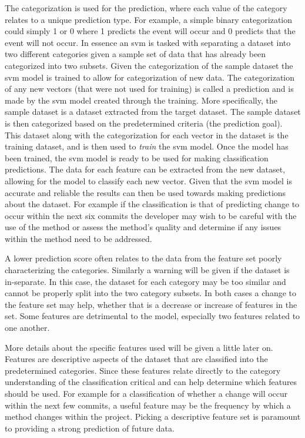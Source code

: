 
The categorization is used for the prediction, where each value of the category relates to a unique prediction type. For example, a simple binary categorization could simply 1 or 0 where 1 predicts the event will occur and 0 predicts that the event will not occur. In essence an \gls{svm} is tasked with separating a dataset into two different categories given a sample set of data that has already been categorized into two subsets. Given the categorization of the sample dataset the \gls{svm} model is trained to allow for categorization of new data. The categorization of any new vectors (that were not used for training) is called a prediction and is made by the \gls{svm} model created through the training. More specifically, the sample dataset is a dataset extracted from the target dataset. The sample dataset is then categorized based on the predetermined criteria (the prediction goal). This dataset along with the categorization for each vector in the dataset is the training dataset, and is then used to \textit{train} the \gls{svm} model. Once the model has been trained, the \gls{svm} model is ready to be used for making classification predictions. The data for each feature can be extracted from the new dataset, allowing for the model to classify each new vector. Given that the \gls{svm} model is accurate and reliable the results can then be used towards making predictions about the dataset. For example if the classification is that of predicting change to occur within the next six commits the developer may wish to be careful with the use of the method or assess the method's quality and determine if any issues within the method need to be addressed.

A lower prediction score often relates to the data from the feature set poorly characterizing the categories. Similarly a warning will be given if the dataset is in-separate. In this case, the dataset for each category may be too similar and cannot be properly split into the two category subsets. In both cases a change to the feature set may help, whether that is a decrease or increase of features in the set. Some features are detrimental to the model, especially two features related to one another. %

More details about the specific features used will be given a little later on. Features are descriptive aspects of the dataset that are classified into the predetermined categories. Since these features relate directly to the category understanding of the classification critical and can help determine which features should be used. For example for a classification of whether a change will occur within the next few commits, a useful feature may be the frequency by which a method changes within the project. Picking a descriptive feature set is paramount to providing a strong prediction of future data.


